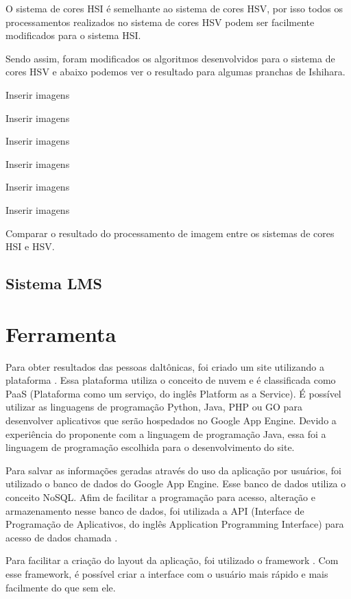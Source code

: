 \documentclass[	12pt, Times, openright, twoside, a4paper, english, brazil]{abntex2}
\begin{document}
O sistema de cores HSI é semelhante ao sistema de cores HSV, por isso todos os processamentos realizados no sistema de cores HSV podem ser facilmente modificados para o sistema HSI.

Sendo assim, foram modificados os algoritmos desenvolvidos para o sistema de cores HSV e abaixo podemos ver o resultado para algumas pranchas de Ishihara.

Inserir imagens

Inserir imagens

Inserir imagens

Inserir imagens

Inserir imagens

Inserir imagens

Comparar o resultado do processamento de imagem entre os sistemas de cores HSI e HSV.

\subsection{Sistema LMS}


\section{Ferramenta}

Para obter resultados das pessoas daltônicas, foi criado um site utilizando a plataforma . Essa plataforma utiliza o conceito de nuvem e é classificada como PaaS (Plataforma como um serviço, do inglês Platform as a Service). É possível utilizar as linguagens de programação Python, Java, PHP ou GO para desenvolver aplicativos que serão hospedados no Google App Engine. Devido a experiência do proponente com a linguagem de programação Java, essa foi a linguagem de programação escolhida para o desenvolvimento do site. 

Para salvar as informações geradas através do uso da aplicação por usuários, foi utilizado o banco de dados do Google App Engine. Esse banco de dados utiliza o conceito NoSQL. Afim de facilitar a programação para acesso, alteração e armazenamento nesse banco de dados, foi utilizada a API (Interface de Programação de Aplicativos, do inglês Application Programming Interface) para acesso de dados chamada .

Para facilitar a criação do layout da aplicação, foi utilizado o framework . Com esse framework, é possível criar a interface com o usuário mais rápido e mais facilmente do que sem ele.
\end{document}
